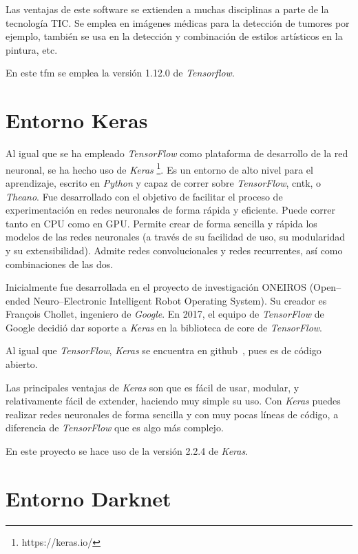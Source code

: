 Las ventajas de este software se extienden a muchas disciplinas a parte de la tecnología TIC. Se emplea en imágenes médicas para la detección de tumores por ejemplo, también se usa en la detección y combinación de estilos artísticos en la pintura, etc.

En este \acrshort{tfm} se emplea la versión 1.12.0 de \textit{Tensorflow}.

\section{Entorno Keras}

Al igual que se ha empleado \textit{TensorFlow} como plataforma de desarrollo de la red neuronal, se ha hecho uso de \textit{Keras} \footnote{https://keras.io/}. Es un entorno de alto nivel para el aprendizaje, escrito en \textit{Python} y capaz de correr sobre \textit{TensorFlow}, \acrshort{cntk}, o \textit{Theano}. Fue desarrollado con el objetivo de facilitar el proceso de experimentación en redes neuronales de forma rápida y eficiente. Puede correr tanto en CPU como en GPU. Permite crear de forma sencilla y rápida los modelos de las redes neuronales (a través de su facilidad de uso, su modularidad y su extensibilidad). Admite redes convolucionales y redes recurrentes, así como combinaciones de las dos.

Inicialmente fue desarrollada en el proyecto de investigación ONEIROS (Open--ended Neuro--Electronic Intelligent Robot Operating System). Su creador es Fran\c{c}ois Chollet, ingeniero de \textit{Google}.
En 2017, el equipo de \textit{TensorFlow} de Google decidió dar soporte a \textit{Keras} en la biblioteca de core de \textit{TensorFlow}.

Al igual que \textit{TensorFlow}, \textit{Keras} se encuentra en github~\cite{keras_github}, pues es de código abierto. 

Las principales ventajas de \textit{Keras} son que es fácil de usar, modular, y relativamente fácil de extender, haciendo muy simple su uso. Con \textit{Keras} puedes realizar redes neuronales de forma sencilla y con muy pocas líneas de código, a diferencia de \textit{TensorFlow} que es algo más complejo. 

En este proyecto se hace uso de la versión 2.2.4 de \textit{Keras}.


\section{Entorno Darknet}

